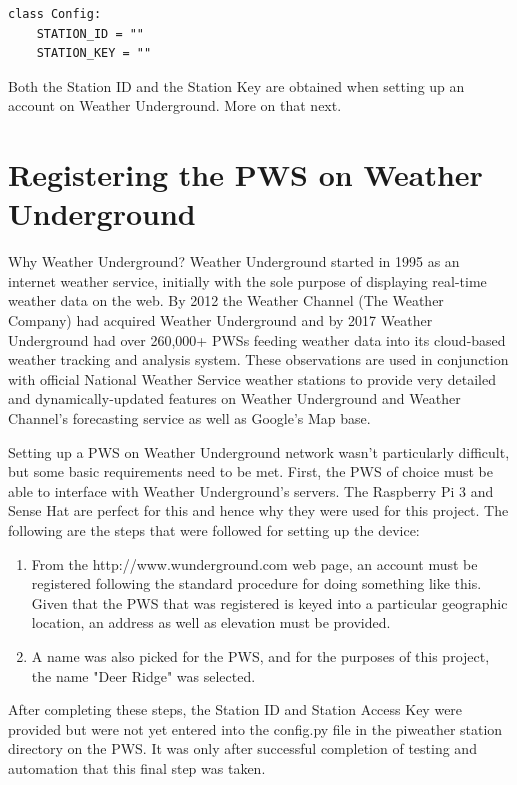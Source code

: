 \documentclass[sigconf]{acmart}
\begin{document}
\begin{code}
\begin{verbatim}
class Config:
    STATION_ID = ""
    STATION_KEY = ""
\end{verbatim}
\end{code}

Both the Station ID and the Station Key are obtained when setting up an account on Weather Underground. More on that next.

\section{Registering the PWS on Weather Underground}

Why Weather Underground? Weather Underground started in 1995 as an internet weather service, initially with the sole purpose of displaying real-time weather data on the web. By 2012 the Weather Channel (The Weather Company) had acquired Weather Underground and by 2017 Weather Underground had over 260,000+ PWSs feeding weather data into its cloud-based weather tracking and analysis system. These observations are used in conjunction with official National Weather Service weather stations to provide very detailed and dynamically-updated features on Weather Underground and Weather Channel's forecasting service as well as Google's Map base.

Setting up a PWS on Weather Underground network wasn't particularly difficult, but some basic requirements need to be met. First, the PWS of choice must be able to interface with Weather Underground's servers. The Raspberry Pi 3 and Sense Hat are perfect for this and hence why they were used for this project. The following are the steps that were followed for setting up the device:

\begin{enumerate}
    \item From the http://www.wunderground.com web page, an account must be registered following the standard procedure for doing something like this. Given that the PWS that was registered is keyed into a particular geographic location, an address as well as elevation must be provided. 
    \item A name was also picked for the PWS, and for the purposes of this project, the name "Deer Ridge" was selected.
\end{enumerate}

After completing these steps, the Station ID and Station Access Key were provided but were not yet entered into the config.py file in the pi\textunderscore weather \textunderscore station directory on the PWS. It was only after successful completion of testing and automation that this final step was taken.
\end{document}
